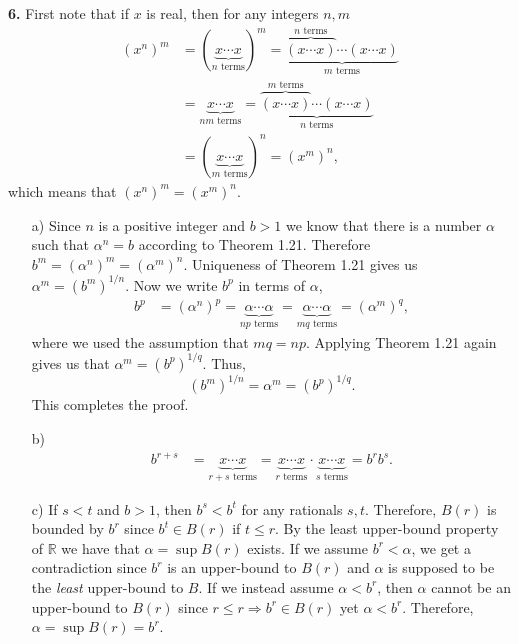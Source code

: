 \documentclass[11pt]{article}
\begin{document}
\noindent\textbf{6.} First note that if $x$ is real, then for any
integers $n, m$
\begin{align*}
  {(x^n)}^m &= {(\underbrace{x\cdots x}_{n\text{ terms}})}^m =
              \underbrace{\overbrace{(x\cdots x)}^{n \text{ terms}}\cdots (x\cdots x)}_{m\text{ terms}} \\
            &= \underbrace{x\cdots x}_{nm\text{ terms}} =
              \underbrace{\overbrace{(x\cdots x)}^{m \text{ terms}}\cdots (x\cdots x)}_{n\text{ terms}} \\
            &= {(\underbrace{x\cdots x}_{m\text{ terms}})}^n = (x^m)^n,
\end{align*}
which means that $(x^n)^m = (x^m)^n$.
\begin{itemize}
\item [a)] Since $n$ is a positive integer and $b>1$ we know that
  there is a number $\alpha$ such that $\alpha^n = b$ according to
  Theorem 1.21. Therefore $b^m = (\alpha^n)^m =
  (\alpha^m)^n$. Uniqueness of Theorem 1.21 gives us
  $\alpha^m = (b^m)^{1/n}$. Now we write $b^p$ in terms of $\alpha$,
  \begin{align*}
    b^p &= (\alpha^n)^p = \underbrace{\alpha\cdots \alpha}_{np\text{ terms}}
          = \underbrace{\alpha\cdots \alpha}_{mq\text{ terms}} = (\alpha^m)^q,
  \end{align*}
  where we used the assumption that $mq = np$. Applying Theorem 1.21
  again gives us that $\alpha^m = (b^p)^{1/q}$. Thus,
  $$ (b^m)^{1/n} = \alpha^m = (b^p)^{1/q}.$$
  This completes the proof.

\item [b)]
  \begin{align*}
    b^{r+s} &= {\underbrace{x\cdots x}_{r + s\text{ terms}}} = {\underbrace{x\cdots x}_{r\text{ terms}}}
              \cdot {\underbrace{x\cdots x}_{s\text{ terms}}} = b^r b^s.
  \end{align*}

\item [c)] If $s < t$ and $b > 1$, then $b^s < b^t$ for any rationals
  $s, t$. Therefore, $B(r)$ is bounded by $b^r$ since $b^t \in B(r)$
  if $t\leq r$. By the least upper-bound property of $\mathbb{R}$ we
  have that $\alpha = \sup{B(r)}$ exists. If we assume $b^r < \alpha$,
  we get a contradiction since $b^r$ is an upper-bound to $B(r)$ and
  $\alpha$ is supposed to be the \emph{least} upper-bound to $B$. If
  we instead assume $\alpha < b^r$, then $\alpha$ cannot be an
  upper-bound to $B(r)$ since $r\leq r \Rightarrow b^r\in B(r)$ yet
  $\alpha < b^r$. Therefore, $\alpha = \sup{B(r)} = b^r$.
\end{itemize}
\end{document}
